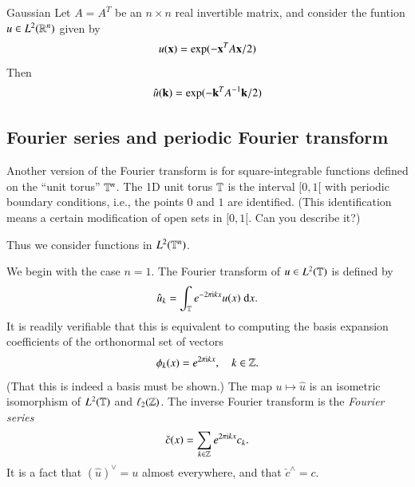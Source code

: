 \begin{myExample}{Gaussian}{}
Let $A = A^T$ be an $n\times n$ real invertible matrix, and consider the funtion $u \in L^2(\mathbb{R}^n)$ given by
\begin{equation} u(\mathbf{x}) = \exp(-\mathbf{x}^T A \mathbf{x}/2)
\end{equation}
Then
\begin{equation} \hat{u}(\mathbf{k}) = \exp(-\mathbf{k}^T A^{-1} \mathbf{k}/2)
\end{equation}
\end{myExample}



\subsection{Fourier series and periodic Fourier transform}

Another version of the Fourier transform is for square-integrable functions defined on the ``unit torus'' $\mathbb{T}^n$. The 1D unit torus $\mathbb{T}$ is the interval $[0,1[$ with periodic boundary conditions, i.e., the points $0$ and $1$ are identified. (This identification means a certain modification of open sets in $[0,1[$. Can you describe it?)

Thus we consider functions in $L^2(\mathbb{T}^n)$.

We begin with the case $n=1$. The Fourier transform  of $u \in L^2(\mathbb{T})$ is defined by
\begin{equation}
    \hat{u}_k = \int_{\mathbb{T}} e^{-2\pi\mathrm{i} k x} u(x) \; \mathrm{d} x.
\end{equation}
It is readily verifiable that this is equivalent to computing the basis expansion coefficients of the orthonormal set of vectors 
\begin{equation}
    \phi_k (x) = e^{2\pi\mathrm{i} k x}, \quad k \in \mathbb{Z}.
\end{equation}
(That this is indeed a basis must be shown.)
The map $u \mapsto \hat{u}$ is an isometric isomorphism of $L^2(\mathbb{T})$ and $\ell_2(\mathbb{Z})$.
The inverse Fourier transform is the \emph{Fourier series}
\begin{equation}
    \check{c}(x) = \sum_{k\in\mathbb{Z}} e^{2\pi \mathrm{i} k x} c_k.
\end{equation}
It is a fact that $(\hat{u})^\vee = u$ almost everywhere, and that $\check{c}^\wedge = c$.

